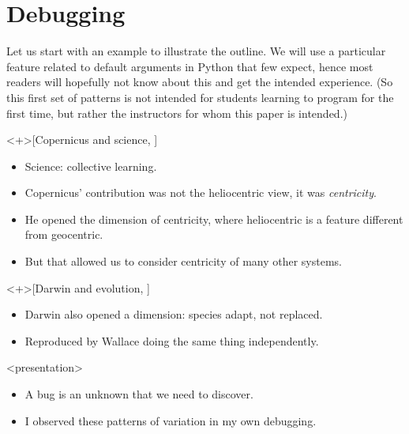 \mode*
{}

\section{Debugging}

Let us start with an example to illustrate the outline.
We will use a particular feature related to default arguments in Python that 
few expect, hence most readers will hopefully not know about this and get the 
intended experience.
(So this first set of patterns is not intended for students learning to program 
for the first time, but rather the instructors for whom this paper is 
intended.)

\begin{frame}
  \begin{example}<+>[Copernicus and science, {\cite[pp.~155--156]{NCOL}}]
    \begin{itemize}
      \item Science: collective learning.
      \item Copernicus' contribution was not the heliocentric view, it was 
        \emph{centricity}.
      \item He opened the dimension of centricity, where heliocentric is a 
        feature different from geocentric.
      \item But that allowed us to consider centricity of many other systems.
    \end{itemize}
  \end{example}

  \begin{example}<+>[Darwin and evolution, {\cite[pp.~157--160]{NCOL}}]
    \begin{itemize}
      \item Darwin also opened a dimension: species adapt, not replaced.
      \item Reproduced by Wallace doing the same thing independently.
    \end{itemize}
  \end{example}
\end{frame}

\begin{frame}<presentation>
  \begin{idea}
    \begin{itemize}
      \item A bug is an unknown that we need to discover.
      \item I observed these patterns of variation in my own debugging.
    \end{itemize}
  \end{idea}
\end{frame}

